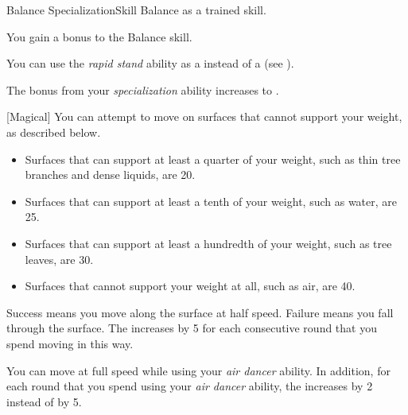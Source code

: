     \begin{feat}{Balance Specialization}{Skill}
        \featpre Balance as a trained skill.

         You gain a  bonus to the Balance skill.

         You can use the \textit{rapid stand} ability as a  instead of a  (see ).

         The bonus from your \textit{specialization} ability increases to .

        [Magical] You can attempt to move on surfaces that cannot support your weight, as described below.
        \begin{itemize}
            \item Surfaces that can support at least a quarter of your weight, such as thin tree branches and dense liquids, are  20.
            \item Surfaces that can support at least a tenth of your weight, such as water, are  25.
            \item Surfaces that can support at least a hundredth of your weight, such as tree leaves, are  30.
            \item Surfaces that cannot support your weight at all, such as air, are  40.
        \end{itemize}

        Success means you move along the surface at half speed.
        Failure means you fall through the surface.
        The  increases by 5 for each consecutive round that you spend moving in this way.

         You can move at full speed while using your \textit{air dancer} ability.
        In addition, for each round that you spend using your \textit{air dancer} ability, the  increases by 2 instead of by 5.
    \end{feat}

